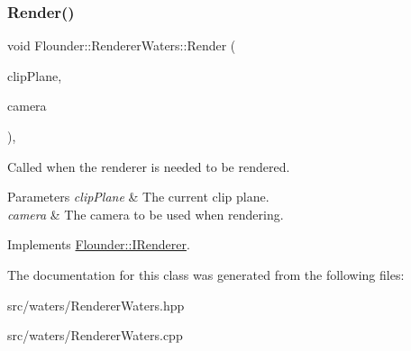 \subsubsection{\texorpdfstring{Render()}{Render()}}
{\footnotesize\ttfamily void Flounder\+::\+Renderer\+Waters\+::\+Render (\begin{DoxyParamCaption}\item[{const \hyperlink{class_flounder_1_1_vector4}{Vector4} \&}]{clip\+Plane,  }\item[{const \hyperlink{class_flounder_1_1_i_camera}{I\+Camera} \&}]{camera }\end{DoxyParamCaption})\hspace{0.3cm}{\ttfamily [override]}, {\ttfamily [virtual]}}



Called when the renderer is needed to be rendered. 


\begin{DoxyParams}{Parameters}
{\em clip\+Plane} & The current clip plane. \\
\hline
{\em camera} & The camera to be used when rendering. \\
\hline
\end{DoxyParams}


Implements \hyperlink{class_flounder_1_1_i_renderer_a4e86d6621f6f63442e1c07655afd9daa}{Flounder\+::\+I\+Renderer}.



The documentation for this class was generated from the following files\+:\begin{DoxyCompactItemize}
\item 
src/waters/Renderer\+Waters.\+hpp\item 
src/waters/Renderer\+Waters.\+cpp\end{DoxyCompactItemize}
